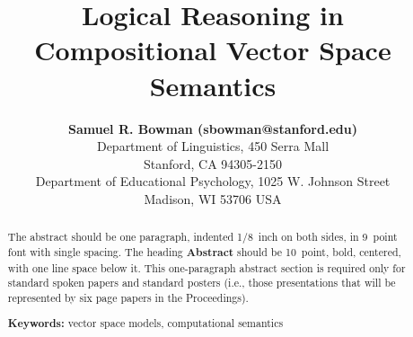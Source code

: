 \documentclass[10pt,letterpaper]{article}
\title{Logical Reasoning in Compositional Vector Space Semantics}
\author{{\large \bf Samuel R. Bowman (sbowman@stanford.edu)} \\
  Department of Linguistics, 450 Serra Mall \\
  Stanford, CA 94305-2150
  \AND {\large \bf Sharon J. Derry (SDJ@Macc.Wisc.Edu)} \\
  Department of Educational Psychology, 1025 W. Johnson Street \\
  Madison, WI 53706 USA}
\begin{document}
\maketitle

\begin{abstract}
The abstract should be one paragraph, indented 1/8~inch on both sides,
in 9~point font with single spacing. The heading {\bf Abstract} should
be 10~point, bold, centered, with one line space below it. This
one-paragraph abstract section is required only for standard spoken
papers and standard posters (i.e., those presentations that will be
represented by six page papers in the Proceedings).

\textbf{Keywords:} 
vector space models, computational semantics\end{abstract}








\end{document}
